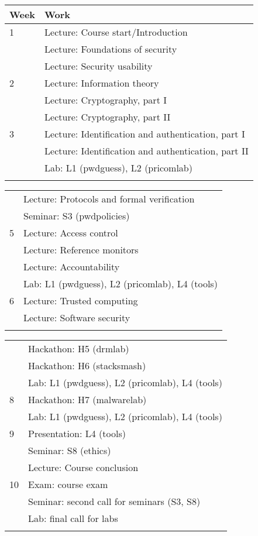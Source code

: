 	\centering
  \begin{tabular}{lp{9cm}}
    \toprule
    \textbf{Week}	& \textbf{Work} \\
    \midrule
    1
    & Lecture: Course start/Introduction\\
    & Lecture: Foundations of security\\
    & Lecture: Security usability\\
    \midrule
    2
    & Lecture: Information theory\\
    & Lecture: Cryptography, part I\\
    & Lecture: Cryptography, part II\\
    \midrule
    3
    & Lecture: Identification and authentication, part I\\
    & Lecture: Identification and authentication, part II\\
    & Lab: L1 (pwdguess), L2 (pricomlab)\\
    \midrule
\mode<presentation>{%
  \end{tabular}
  \begin{tabular}{lp{9cm}}
}%
    4
    & Lecture: Protocols and formal verification\\
    & Seminar: S3 (pwdpolicies)\\
    \midrule
    5
    & Lecture: Access control\\
    & Lecture: Reference monitors\\
    & Lecture: Accountability\\
    & Lab: L1 (pwdguess), L2 (pricomlab), L4 (tools)\\
    \midrule
    6
    & Lecture: Trusted computing\\
    & Lecture: Software security\\
    \midrule
\mode<presentation>{%
  \end{tabular}
  \begin{tabular}{lp{9cm}}
}%
    7
    & Hackathon: H5 (drmlab)\\
    & Hackathon: H6 (stacksmash)\\
    & Lab: L1 (pwdguess), L2 (pricomlab), L4 (tools)\\
    \midrule
    8
    & Hackathon: H7 (malwarelab)\\
    & Lab: L1 (pwdguess), L2 (pricomlab), L4 (tools)\\
    \midrule
    9
    & Presentation: L4 (tools)\\
    & Seminar: S8 (ethics)\\
    & Lecture: Course conclusion\\
    \midrule
    10
    & Exam: course exam\\
    & Seminar: second call for seminars (S3, S8)\\
    & Lab: final call for labs\\
    \midrule
\mode<presentation>{%
  \end{tabular}
